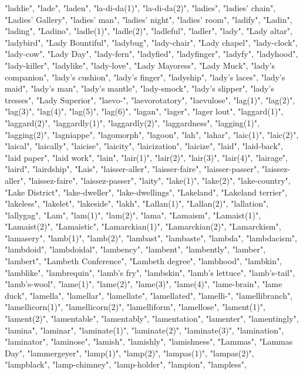 "laddie",
"lade",
"laden",
"la-di-da(1)",
"la-di-da(2)",
"ladies",
"ladies' chain",
"Ladies' Gallery",
"ladies' man",
"ladies' night",
"ladies' room",
"ladify",
"Ladin",
"lading",
"Ladino",
"ladle(1)",
"ladle(2)",
"ladleful",
"ladler",
"lady",
"Lady altar",
"ladybird",
"Lady Bountiful",
"ladybug",
"lady-chair",
"Lady chapel",
"lady-clock",
"lady-cow",
"Lady Day",
"lady-fern",
"ladyfied",
"ladyfinger",
"ladyfy",
"ladyhood",
"lady-killer",
"ladylike",
"lady-love",
"Lady Mayoress",
"Lady Muck",
"lady's companion",
"lady's cushion",
"lady's finger",
"ladyship",
"lady's laces",
"lady's maid",
"lady's man",
"lady's mantle",
"lady-smock",
"lady's slipper",
"lady's tresses",
"Lady Superior",
"laevo-",
"laevorotatory",
"laevulose",
"lag(1)",
"lag(2)",
"lag(3)",
"lag(4)",
"lag(5)",
"lag(6)",
"lagan",
"lager",
"lager lout",
"laggard(1)",
"laggard(2)",
"laggardly(1)",
"laggardly(2)",
"laggardness",
"lagging(1)",
"lagging(2)",
"lagniappe",
"lagomorph",
"lagoon",
"lah",
"lahar",
"laic(1)",
"laic(2)",
"laical",
"laically",
"laicise",
"laicity",
"laicization",
"laicize",
"laid",
"laid-back",
"laid paper",
"laid work",
"lain",
"lair(1)",
"lair(2)",
"lair(3)",
"lair(4)",
"lairage",
"laird",
"lairdship",
"Lais",
"laisser-aller",
"laisser-faire",
"laisser-passer",
"laissez-aller",
"laissez-faire",
"laissez-passer",
"laity",
"lake(1)",
"lake(2)",
"lake-country",
"Lake District",
"lake-dweller",
"lake-dwellings",
"Lakeland",
"Lakeland terrier",
"lakeless",
"lakelet",
"lakeside",
"lakh",
"Lallan(1)",
"Lallan(2)",
"lallation",
"lallygag",
"Lam",
"lam(1)",
"lam(2)",
"lama",
"Lamaism",
"Lamaist(1)",
"Lamaist(2)",
"Lamaistic",
"Lamarckian(1)",
"Lamarckian(2)",
"Lamarckism",
"lamasery",
"lamb(1)",
"lamb(2)",
"lambast",
"lambaste",
"lambda",
"lambdacism",
"lambdoid",
"lambdoidal",
"lambency",
"lambent",
"lambently",
"lamber",
"lambert",
"Lambeth Conference",
"Lambeth degree",
"lambhood",
"lambkin",
"lamblike",
"lambrequin",
"lamb's fry",
"lambskin",
"lamb's lettuce",
"lamb's-tail",
"lamb's-wool",
"lame(1)",
"lame(2)",
"lame(3)",
"lame(4)",
"lame-brain",
"lame duck",
"lamella",
"lamellar",
"lamellate",
"lamellated",
"lamelli-",
"lamellibranch",
"lamellicorn(1)",
"lamellicorn(2)",
"lamelliform",
"lamellose",
"lament(1)",
"lament(2)",
"lamentable",
"lamentably",
"lamentation",
"lamenter",
"lamentingly",
"lamina",
"laminar",
"laminate(1)",
"laminate(2)",
"laminate(3)",
"lamination",
"laminator",
"laminose",
"lamish",
"lamishly",
"lamishness",
"Lammas",
"Lammas Day",
"lammergeyer",
"lamp(1)",
"lamp(2)",
"lampas(1)",
"lampas(2)",
"lampblack",
"lamp-chimney",
"lamp-holder",
"lampion",
"lampless",
